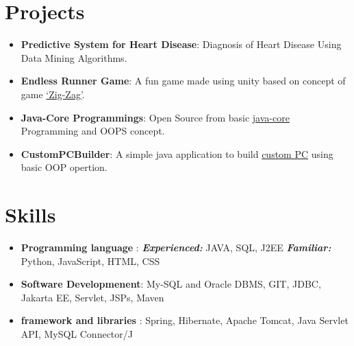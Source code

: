 \documentclass[letterpaper,11pt]{article}
\newcommand{\resumeItem}[2]{
  \item\small{
    \textbf{#1}{: #2 \vspace{-2pt}}
  }
}
\newcommand{\resumeSubItem}[2]{\resumeItem{#1}{#2}\vspace{-4pt}}
\newcommand{\resumeSubHeadingListStart}{\begin{itemize}[leftmargin=*]}
\newcommand{\resumeSubHeadingListEnd}{\end{itemize}}
\begin{document}
\section{Projects}
\resumeSubHeadingListStart
\resumeSubItem{Predictive System for Heart Disease}
{Diagnosis of Heart Disease Using Data Mining Algorithms.}
\resumeSubItem{Endless Runner Game}
{A fun game made using unity based on concept of game \href{https://play.google.com/store/apps/details?id=com.rahulsinghparmar}{‘Zig-Zag’}.}
\resumeSubItem{Java-Core Programmings}
{Open Source from basic \href{https://github.com/RahulSinghParmar/JAVA-Core}{java-core} Programming and OOPS concept.}
\resumeSubItem{CustomPCBuilder}
{A simple java application to build \href{https://github.com/RahulSinghParmar/CustomPcBuild}{custom PC} using basic OOP opertion.}
\resumeSubHeadingListEnd

%
\section{Skills}
\resumeSubHeadingListStart
\item{
            \textbf{Programming language }{: \textit{\small \textbf{Experienced:}} JAVA, SQL, J2EE \textit{\small \textbf{Familiar:}} Python, JavaScript, HTML, CSS}
      }
\item {
            \textbf{Software Developmenent}{: My-SQL and Oracle DBMS, GIT, JDBC, Jakarta EE, Servlet, JSPs, Maven }
      }
\item{
            \textbf{framework and libraries }{: Spring, Hibernate, Apache Tomcat, Java Servlet API, MySQL Connector/J}
      }

\resumeSubHeadingListEnd




\end{document}
